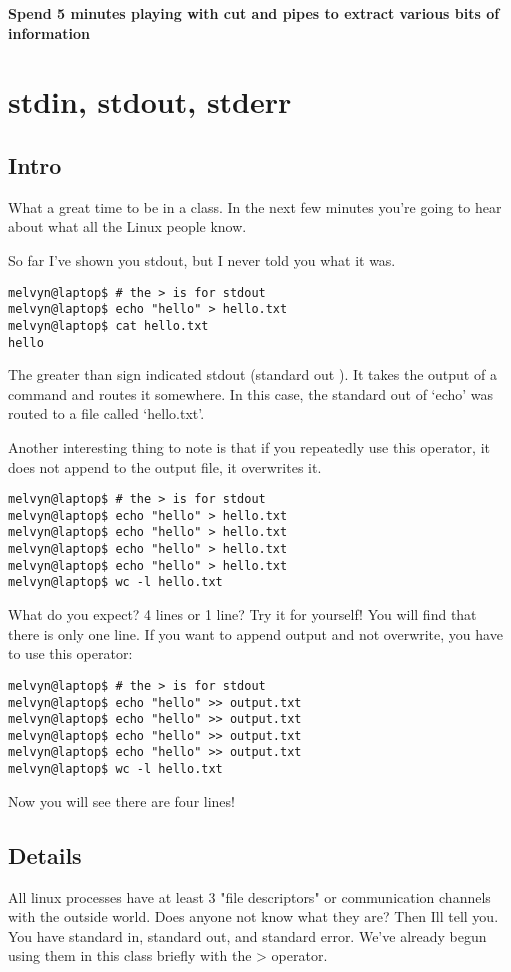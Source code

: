 \documentclass[10pt]{article}
\begin{document}
\textbf{Spend 5 minutes playing with cut and pipes to extract various bits of
information}

\section*{stdin, stdout, stderr}
\subsection*{Intro}
What a great time to be in a class. In the next few minutes you're going to hear
about what all the Linux people know.

So far I've shown you stdout, but I never told you what it was.
\begin{lstlisting}[style=term]
melvyn@laptop$ # the > is for stdout
melvyn@laptop$ echo "hello" > hello.txt
melvyn@laptop$ cat hello.txt
hello
\end{lstlisting} 

The greater than sign indicated stdout (standard out ). It takes the output of a
command and routes it somewhere. In this case, the standard out of `echo' was
routed to a file called `hello.txt'.

Another interesting thing to note is that if you repeatedly use this operator,
it does not append to the output file, it overwrites it.

\begin{lstlisting}[style=term]
melvyn@laptop$ # the > is for stdout
melvyn@laptop$ echo "hello" > hello.txt
melvyn@laptop$ echo "hello" > hello.txt
melvyn@laptop$ echo "hello" > hello.txt
melvyn@laptop$ echo "hello" > hello.txt
melvyn@laptop$ wc -l hello.txt
\end{lstlisting} 

What do you expect? 4 lines or 1 line? Try it for yourself! You will find that
there is only one line. If you want to append output and not overwrite, you have
to use this operator:

\begin{lstlisting}[style=term]
melvyn@laptop$ # the > is for stdout
melvyn@laptop$ echo "hello" >> output.txt
melvyn@laptop$ echo "hello" >> output.txt
melvyn@laptop$ echo "hello" >> output.txt
melvyn@laptop$ echo "hello" >> output.txt
melvyn@laptop$ wc -l hello.txt
\end{lstlisting} 

Now you will see there are four lines!

\subsection*{Details}
All linux processes have at least 3 "file descriptors" or communication channels with the outside world. Does anyone not know what they are? Then Ill tell you. You have standard in, standard out, and standard error. We've already begun using them in this class briefly with the > operator. 
\end{document}
